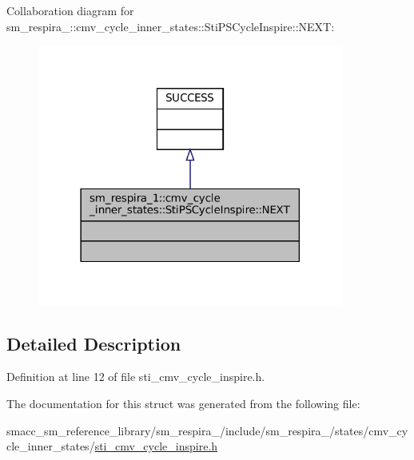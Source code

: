 Collaboration diagram for sm\+\_\+respira\+\_\+:\+:cmv\+\_\+cycle\+\_\+inner\+\_\+states\+:\+:Sti\+P\+S\+Cycle\+Inspire\+:\+:N\+E\+XT\+:
\nopagebreak
\begin{figure}[H]
\begin{center}
\leavevmode
\includegraphics[width=285pt]{structsm__respira__1_1_1cmv__cycle__inner__states_1_1StiPSCycleInspire_1_1NEXT__coll__graph}
\end{center}
\end{figure}


\subsection{Detailed Description}


Definition at line 12 of file sti\+\_\+cmv\+\_\+cycle\+\_\+inspire.\+h.



The documentation for this struct was generated from the following file\+:\begin{DoxyCompactItemize}
\item 
smacc\+\_\+sm\+\_\+reference\+\_\+library/sm\+\_\+respira\+\_/include/sm\+\_\+respira\+\_/states/cmv\+\_\+cycle\+\_\+inner\+\_\+states/\hyperlink{sti__cmv__cycle__inspire_8h}{sti\+\_\+cmv\+\_\+cycle\+\_\+inspire.\+h}\end{DoxyCompactItemize}

